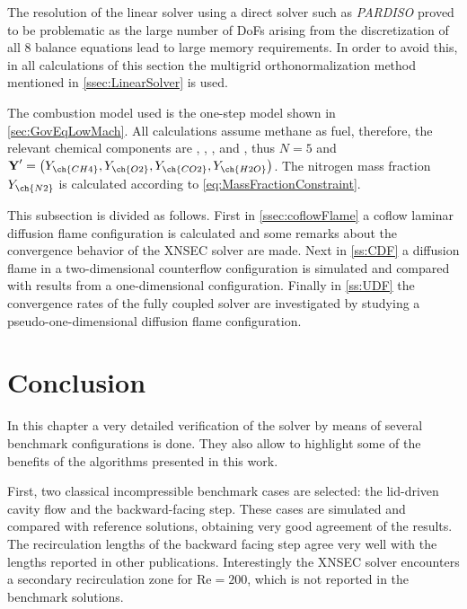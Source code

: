 The resolution of the linear solver using a direct solver such as \textit{PARDISO} proved to be problematic as the large number of DoFs arising from the discretization of all 8 balance equations lead to large memory requirements.  In order to avoid this, in all calculations of this section the multigrid orthonormalization method mentioned in \cref{ssec:LinearSolver} is used.

The combustion model used is the one-step model shown in \cref{sec:GovEqLowMach}. All calculations assume methane as fuel, therefore, the relevant chemical components are , , ,  and , thus $N = 5$ and $\vec{Y}' = \left(Y_{\ch{CH4}},Y_{\ch{O2}},Y_{\ch{CO2}},Y_{\ch{H2O}}\right)$. The nitrogen mass fraction $Y_{\ch{N2}}$ is calculated according to \cref{eq:MassFractionConstraint}.%

This subsection is divided as follows. First in \cref{ssec:coflowFlame} a coflow laminar diffusion flame configuration is calculated and some remarks about the convergence behavior of the XNSEC solver are made. Next in \cref{ss:CDF} a diffusion flame in a two-dimensional counterflow configuration is simulated and compared with results from a one-dimensional configuration. Finally in \cref{ss:UDF} the convergence rates of the fully coupled solver are investigated by studying a pseudo-one-dimensional diffusion flame configuration.







\section{Conclusion}
In this chapter a very detailed verification of the solver by means of several benchmark configurations is done. They also allow to highlight some of the benefits of the algorithms presented in this work.

First, two classical incompressible benchmark cases are selected: the lid-driven cavity flow and the backward-facing step. These cases are simulated and compared with reference solutions, obtaining very good agreement of the results. The recirculation lengths of the backward facing step agree very well with the lengths reported in other publications. Interestingly the XNSEC solver encounters a secondary recirculation zone for $\text{Re} = 200$, which is not reported in the benchmark solutions.

